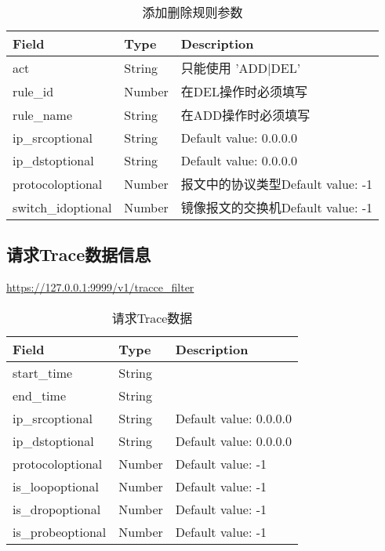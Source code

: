 \begin{table}[]
    \centering
    \caption{添加删除规则参数}
    \label{tbl:add_del_rule}
    \begin{tabular}{lll} \hline
    Field              & Type   & Description                 \\ \hline
    act                & String & 只能使用 'ADD|DEL'              \\
    rule\_id           & Number & 在DEL操作时必须填写                 \\
    rule\_name         & String & 在ADD操作时必须填写                 \\
    ip\_srcoptional    & String & Default value: 0.0.0.0      \\
    ip\_dstoptional    & String & Default value: 0.0.0.0      \\
    protocoloptional   & Number & 报文中的协议类型Default value: -1   \\
    switch\_idoptional & Number & 镜像报文的交换机Default value: -1 \\ \hline
    \end{tabular}
\end{table}

\subsection{请求Trace数据信息}

\url{https://127.0.0.1:9999/v1/tracce_filter}

\begin{table}[]
    \centering
    \caption{请求Trace数据}
    \label{tbl:get_trace}
    \begin{tabular}{lll} \hline
    Field             & Type   & Description            \\ \hline
    start\_time       & String &                        \\
    end\_time         & String &                        \\
    ip\_srcoptional   & String & Default value: 0.0.0.0 \\
    ip\_dstoptional   & String & Default value: 0.0.0.0 \\
    protocoloptional  & Number & Default value: -1      \\
    is\_loopoptional  & Number & Default value: -1      \\
    is\_dropoptional  & Number & Default value: -1      \\
    is\_probeoptional & Number & Default value: -1      \\ \hline
    \end{tabular}
\end{table}


